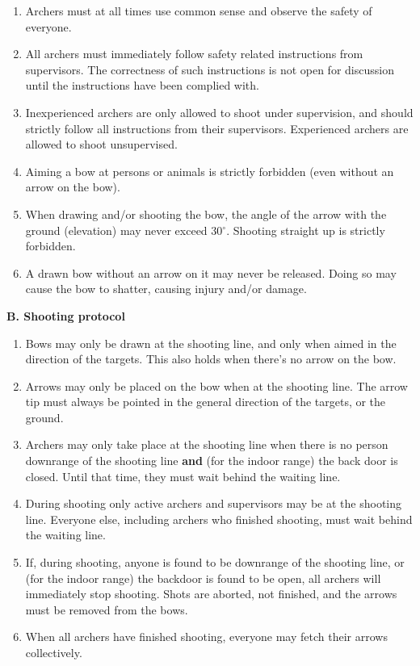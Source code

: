 \documentclass[a4paper]{article}
\begin{document}
\begin{enumerate}
  \item Archers must at all times use common sense and observe the safety of everyone.
  \item All archers must immediately follow safety related instructions from supervisors. The correctness of such instructions is not open for discussion until the instructions have been complied with.
  \item Inexperienced archers are only allowed to shoot under supervision, and should strictly follow all instructions from their supervisors. Experienced archers are allowed to shoot unsupervised.
  \item Aiming a bow at persons or animals is strictly forbidden (even without an arrow on the bow).
  \item When drawing and/or shooting the bow, the angle of the arrow with the ground (elevation) may never exceed 30$^\circ$. Shooting straight up is strictly forbidden.
  \item A drawn bow without an arrow on it may never be released. Doing so may cause the bow to shatter, causing injury and/or damage.
\end{enumerate}



{\bf B. Shooting protocol}

\begin{enumerate}
  \item Bows may only be drawn at the shooting line, and only when aimed in the direction of the targets. This also holds when there's no arrow on the bow.
  \item Arrows may only be placed on the bow when at the shooting line. The arrow tip must always be pointed in the general direction of the targets, or the ground.
  \item Archers may only take place at the shooting line when there is no person downrange of the shooting line {\bf and} (for the indoor range) the back door is closed. Until that time, they must wait behind the waiting line.
  \item During shooting only active archers and supervisors may be at the shooting line. Everyone else, including archers who finished shooting, must wait behind the waiting line.
  \item If, during shooting, anyone is found to be downrange of the shooting line, or (for the indoor range) the backdoor is found to be open, all archers will immediately stop shooting. Shots are aborted, not finished, and the arrows must be removed from the bows.
  \item When all archers have finished shooting, everyone may fetch their arrows collectively.
\end{enumerate}
\end{document}
